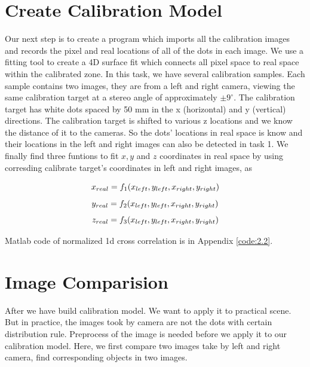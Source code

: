 \section{Create Calibration Model}

Our next step is to create a program which imports all the calibration images and records the pixel and real locations of all of the dots in each image. We use a fitting tool to create a 4D surface fit which connects all pixel space to real space within the calibrated zone. In this task, we have several calibration samples. Each sample contains two images, they are from a left and right camera, viewing the same calibration target at a stereo angle of approximately $\pm9^{\circ}$. The calibration target has white dots spaced by 50 mm in the x (horizontal) and y (vertical) directions. The calibration target is shifted to various z locations and we know the distance of it to the cameras. So the dots' locations in real space is know and their locations in the left and right images can also be detected in task 1. We finally find three funtions to fit $x,y$ and $z$ coordinates in real space by using corresding calibrate target's coordinates in left and right images, as

\begin{equation*}
	\centering
	x_{real} = f_{1}(x_{left}, y_{left}, x_{right}, y_{right}) 
\end{equation*}
\begin{equation*}
	\centering
	y_{real} = f_{2}(x_{left}, y_{left}, x_{right}, y_{right}) 
\end{equation*}
\begin{equation*}
	\centering
	z_{real} = f_{3}(x_{left}, y_{left}, x_{right}, y_{right}) 
\end{equation*}

Matlab code of normalized 1d cross correlation is in Appendix \ref{code:2.2}.

\section{Image Comparision}

After we have build calibration model. We want to apply it to practical scene. But in practice, the images took by camera are not the dots with certain distribution rule. Preprocess of the image is needed before we apply it to our calibration model. Here, we first compare two images take by left and right camera, find corresponding objects in two images.

